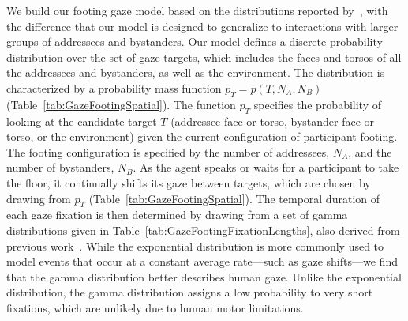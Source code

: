 We build our footing gaze model based on the distributions reported by~\citet{mutlu2012conversational}, with the difference that our model is designed to generalize to interactions with larger groups of addressees and bystanders. Our model defines a discrete probability distribution over the set of gaze targets, which includes the faces and torsos of all the addressees and bystanders, as well as the environment. The distribution is characterized by a probability mass function $p_T = p(T, N_A, N_B)$ (Table~\ref{tab:GazeFootingSpatial}). The function $p_T$ specifies the probability of looking at the candidate target $T$ (addressee face or torso, bystander face or torso, or the environment) given the current configuration of participant footing. The footing configuration is specified by the number of addressees, $N_A$, and the number of bystanders, $N_B$. As the agent speaks or waits for a participant to take the floor, it continually shifts its gaze between targets, which are chosen by drawing from $p_T$ (Table~\ref{tab:GazeFootingSpatial}). The temporal duration of each gaze fixation is then determined by drawing from a set of gamma distributions given in Table~\ref{tab:GazeFootingFixationLengths}, also derived from previous work~\citep{mutlu2012conversational}. While the exponential distribution is more commonly used to model events that occur at a constant average rate---such as gaze shifts---we find that the gamma distribution better describes human gaze. Unlike the exponential distribution, the gamma distribution assigns a low probability to very short fixations, which are unlikely due to human motor limitations.

